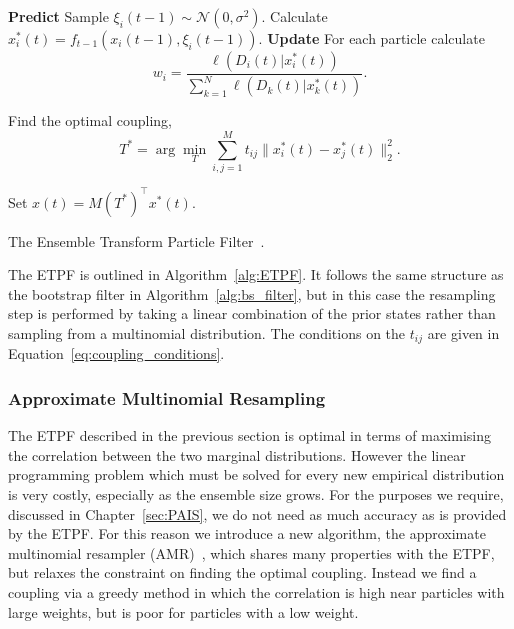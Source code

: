 \documentclass[final]{siamltex}
\let\oldnl\nl%
\newcommand{\nonl}{\renewcommand{\nl}{\let\nl\oldnl}}%
\begin{document}
\begin{table}[htpb]
\begin{algorithm}[H]
\DontPrintSemicolon
\BlankLine

\nonl \textbf{Predict}\;
Sample $\xi_i(t-1) \sim \mathcal{N}(0, \sigma^2)$.\;
Calculate $x_i^*(t) = f_{t-1}(x_i(t-1), \xi_i(t-1))$.\;
\nonl \textbf{Update}\;
For each particle calculate
\[
	w_i = \frac{\ell(D_i(t)| x_i^*(t))}{\sum_{k=1}^N \! \ell(D_k(t)| x_k^*(t))}.
\]

Find the optimal coupling,
\[
	T^* = \arg\min\limits_{T} \sum\limits_{i,j=1}^M \! t_{ij}\|x_i^*(t) - x_j^*(t)\|^2_2.
\]

Set $x(t) = M(T^*)^\top x^*(t)$.\;

\caption{The Ensemble Transform Particle Filter~\cite{reich2013nonparametric}.\label{alg:ETPF}}
\end{algorithm}
\end{table}

The ETPF is outlined in Algorithm~\ref{alg:ETPF}. It follows the same structure as the bootstrap
filter in Algorithm~\ref{alg:bs_filter}, but in this case the resampling step is performed by taking
a linear combination of the prior states rather than sampling from a multinomial distribution. The
conditions on the $t_{ij}$ are given in Equation~\eqref{eq:coupling_conditions}.


\subsubsection{Approximate Multinomial Resampling}

The ETPF described in the previous section is optimal in terms of maximising the correlation between
the two marginal distributions. However the linear programming problem which must be solved for
every new empirical distribution is very costly, especially as the ensemble size grows. For the
purposes we require, discussed in Chapter~\ref{sec:PAIS}, we do not need as much accuracy as is
provided by the ETPF. For this reason we introduce a new algorithm, the approximate multinomial
resampler (AMR)~\cite{cotter2015parallel}, which shares many properties with the ETPF, but relaxes the constraint on
finding the optimal coupling. Instead we find a coupling via a greedy method in which the
correlation is high near particles with large weights, but is poor for particles with a low weight.
\end{document}
